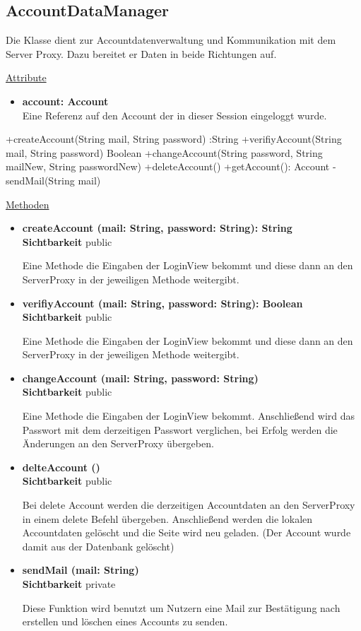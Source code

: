 \newpage
\subsection{AccountDataManager}

Die Klasse dient zur Accountdatenverwaltung und Kommunikation mit dem Server Proxy. Dazu bereitet er Daten in beide Richtungen auf.

\underline{Attribute}
\begin{itemize}
\itemsep0pt

\item \textbf{account: Account} \hfill\\ 
Eine Referenz auf den Account der in dieser Session eingeloggt wurde.

\end{itemize}

+createAccount(String mail, String password) :String
+verifiyAccount(String mail, String password) Boolean
+changeAccount(String password, String mailNew, String passwordNew)
+deleteAccount()
+getAccount(): Account
-sendMail(String mail)

\underline{Methoden}
\begin{itemize}
\itemsep0pt
\item \textbf{createAccount (mail: String, password: String): String}\hfill\\
\textbf{Sichtbarkeit} public

Eine Methode die Eingaben der LoginView bekommt und diese dann an den ServerProxy in der jeweiligen Methode weitergibt.

\item \textbf{verifiyAccount (mail: String, password: String): Boolean}\hfill\\
\textbf{Sichtbarkeit} public

Eine Methode die Eingaben der LoginView bekommt und diese dann an den ServerProxy in der jeweiligen Methode weitergibt.

\item \textbf{changeAccount (mail: String, password: String)}\hfill\\
\textbf{Sichtbarkeit} public

Eine Methode die Eingaben der LoginView bekommt. Anschließend wird das Passwort mit dem derzeitigen Passwort verglichen, bei Erfolg werden die Änderungen an den ServerProxy übergeben.

\item \textbf{delteAccount ()}\hfill\\
\textbf{Sichtbarkeit} public

Bei delete Account werden die derzeitigen Accountdaten an den ServerProxy in einem delete Befehl übergeben. Anschließend werden die lokalen Accountdaten gelöscht und die Seite wird neu geladen. 
(Der Account wurde damit aus der Datenbank gelöscht)

\item \textbf{sendMail (mail: String)}\hfill\\
\textbf{Sichtbarkeit} private

Diese Funktion wird benutzt um Nutzern eine Mail zur Bestätigung nach erstellen und löschen eines Accounts zu senden.
\end{itemize}